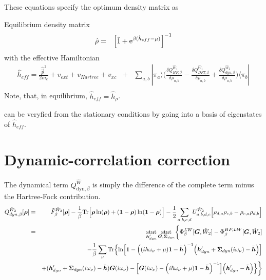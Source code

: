 \documentclass[11pt,a4paper]{report}
\begin{document}
These equations specify the optimum density matrix as
\begin{myshadowminipage}{Equilibrium density matrix}
\begin{eqnarray}
\hat{\rho}&=&\left[\hat{1}+\mathrm{e}^{\beta(\hat{h}_{eff}-\mu)}\right]^{-1}
\label{eq:rhoopt}
\end{eqnarray}
with the effective Hamiltonian
\begin{eqnarray}
\hat{h}_{eff}=\frac{\hat{\vec{p}}^2}{2m_e}+v_{ext}+v_{Hartree}+v_{xc}
&+&\sum_{a,b}|\pi_a\rangle\biggl(
\frac{\delta Q^{\hat{W}_1}_{HF,\beta}}{\delta\rho_{a,b}}
-\frac{\delta Q^{\hat{W}_1}_{DFT,\beta}}{\delta\rho_{a,b}}
+\frac{\delta Q^{\hat{W}_2}_{dyn,\beta}}{\delta\rho_{a,b}}
\biggr)\langle\pi_b|
\nonumber\\
\end{eqnarray}
Note, that, in equilibrium, $\hat{h}_{eff}=\hat{h}_\rho$.
\end{myshadowminipage}
 can be veryfied from the stationary conditions by going
into a basis of eigenstates of $\hat{h}_{eff}$.

\section{Dynamic-correlation correction}
\label{sec:dyncorelcorr}
The dynamical term
$Q_{\text{dyn},\beta}^{\hat{W}}$
is simply the difference of the complete term minus the Hartree-Fock
contribution.
\begin{eqnarray}
Q^{\hat{W}_2}_{dyn,\beta}[\bm{\rho}]
&=&\tilde{F}^{\hat{W}_2}_\beta[\bm{\rho}]
-
\frac{1}{\beta}\mathrm{Tr}\Bigl[
\bm{\rho}\ln(\bm{\rho})+(\bm{1}-\bm{\rho})\ln(\bm{1}-\bm{\rho})\Bigr]
-
\frac{1}{2}\sum_{a,b,c,d}U^{\hat{W}_2}_{a,b,d,c}
\Bigl[\rho_{d,a}\rho_{c,b}-\rho_{c,a}\rho_{d,b}\Bigr]
\nonumber\\
&=&
\operatorname*{stat}_{\bm{h}'_{dyn}}\operatorname*{stat}_{\bm{G},\bm{\Sigma}_{dyn}}
\biggl\lbrace
\Phi^{LW}_\beta[\bm{G},\hat{W}_2]-\Phi^{HF,LW}_\beta[\bm{G},\hat{W}_2]
\nonumber\\
&&-\frac{1}{\beta}\sum_\nu\mathrm{Tr}\Bigl\lbrace
\ln\Bigl[
\bm{1}-
\Bigl((i\hbar\omega_\nu+\mu)\bm{1}-\bar{\bm{h}}\Bigr)^{-1}
\Bigl(\bm{h}'_{dyn}+\bm{\Sigma}_{dyn}(i\omega_\nu)-\bar{\bm{h}}\Bigr)
\Bigr]
\nonumber\\&&
+(\bm{h}'_{dyn}+\bm{\Sigma}_{dyn}(i\omega_\nu)-\bar{\bm{h}})\bm{G}(i\omega_\nu)
-
\Bigl[
\bm{G}(i\omega_\nu)
-\Bigl(i\hbar\omega_\nu+\mu)\bm{1}-\bar{\bm{h}}\Bigr)^{-1}
\Bigr]
\Bigl(\bm{h}'_{dyn}-\bar{\bm{h}}\Bigr)\Bigr\rbrace
\biggr\rbrace
\nonumber\\
\label{eq:dmf1greena}
\end{eqnarray}
\end{document}
